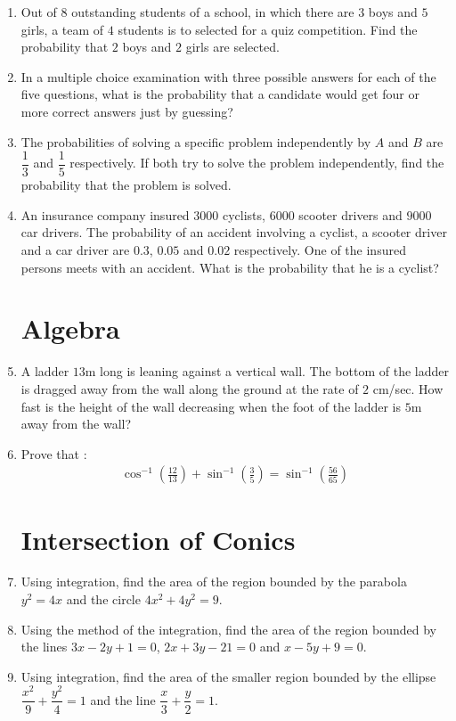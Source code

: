 \documentclass[12pt,-letter paper]{article}
\providecommand{\brak}[1]{\ensuremath{\left(#1\right)}}
\begin{document}
{\begin{enumerate}
\section{ \centering Probability}
\item Out of $8$ outstanding students of a school, in which there are $3$ boys and $5$ girls, a team of $4$ students is to selected for a quiz competition. Find the probability that $2$ boys and $2$ girls are selected.
\item In a multiple choice examination with three possible answers for each of the five questions, what is the probability that a candidate would get four or more correct answers just by guessing?
\item The probabilities of solving a specific problem independently by ${A}$ and ${B}$ are $\dfrac{1}{3}$ and $\dfrac{1}{5}$ respectively. If both try to solve the problem independently, find the probability that the problem is solved.
\item An insurance company insured $3000$ cyclists, $6000$ scooter drivers and $9000$ car drivers. The probability of an accident involving a cyclist, a scooter driver and a car driver are $0.3$, $0.05$ and $0.02$ respectively. One of the insured persons meets with an accident. What is the probability that he is a cyclist?
\section{\centering Algebra}
\item A ladder $13$m long is leaning against a vertical wall. The bottom of the ladder is dragged away from the wall along the ground at the rate of $2$ cm/sec. How fast is the height of the wall decreasing when the foot of the ladder is $5$m away from the wall?
\item Prove that : \begin{align*} \cos^{-1}{\brak{\frac{12}{13}}}+\sin^{-1}{\brak{\frac{3}{5}}}=\sin^{-1}{\brak{\frac{56}{65}}}\end{align*}
\section{ \centering Intersection of Conics}
\item Using integration, find the area of the region bounded by the parabola ${y}^{2}=4{x}$ and the circle $4{x}^{2}+4{y}^{2}=9$.
\item Using the method of the integration, find the area of the region bounded by the lines $3{x}-2{y}+1=0$, $2{x}+3{y}-21=0$ and ${x}-5{y}+9=0$.
\item Using integration, find the area of the smaller region bounded by the ellipse $\dfrac{x^{2}}{9}+\dfrac{y^{2}}{4}=1$ and the line $\dfrac{x}{3}+\dfrac{y}{2}=1$.

\end{enumerate}}
\end{document}
